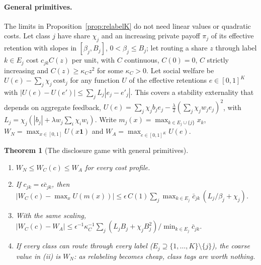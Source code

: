 \documentclass[12pt]{article}
\newtheorem{theorem}{Theorem}[section]
\theoremstyle{definition}
\theoremstyle{remark}
\begin{document}
\paragraph{General primitives.} The limits in Proposition~\ref{prop:relabelK} do not need linear values or quadratic costs. Let class $j$ have share $\chi_j$ and an increasing private payoff $\pi_j$ of its effective retention with slopes in $[\beta_j,B_j]$, $0<\beta_j\le B_j$; let routing a share $z$ through label $k\in E_j$ cost $c_{jk}C(z)$ per unit, with $C$ continuous, $C(0)=0$, $C$ strictly increasing and $C(z)\ge\kappa_Cz^2$ for some $\kappa_C>0$. Let social welfare be $U(e)-\sum_j\chi_j\,\mathrm{cost}_j$ for any function $U$ of the effective retentions $e\in[0,1]^K$ with $|U(e)-U(e')|\le\sum_jL_j|e_j-e'_j|$. This covers a stability externality that depends on aggregate feedback, $U(e)=\sum_j\chi_jb_je_j-\tfrac\lambda2(\sum_j\chi_jw_je_j)^2$, with $L_j=\chi_j(|b_j|+\lambda w_j\sum_i\chi_iw_i)$. Write $m_j(x)=\max_{k\in E_j\cup\{j\}}x_k$, $W_N=\max_{x\in[0,1]}U(x\mathbf 1)$ and $W_A=\max_{e\in[0,1]^K}U(e)$.

\begin{theorem}[The disclosure game with general primitives]\label{thm:relabelgeneral}
\begin{enumerate}[label=(\roman*),itemsep=1pt]
\item $W_N\le W_C(c)\le W_A$ for every cost profile.
\item If $c_{jk}=\epsilon\bar c_{jk}$, then $\big|W_C(c)-\max_xU(m(x))\big|\le\epsilon\,C(1)\sum_j\max_{k\in E_j}\bar c_{jk}\,(L_j/\beta_j+\chi_j)$.
\item With the same scaling, $|W_C(c)-W_A|\le\epsilon^{-1}\kappa_C^{-1}\sum_j(L_jB_j+\chi_jB_j^2)/\min_{k\in E_j}\bar c_{jk}$.
\item If every class can route through every label ($E_j\supseteq\{1,\ldots,K\}\setminus\{j\}$), the coarse value in (ii) is $W_N$: as relabeling becomes cheap, class tags are worth nothing.
\end{enumerate}
\end{theorem}
\end{document}
